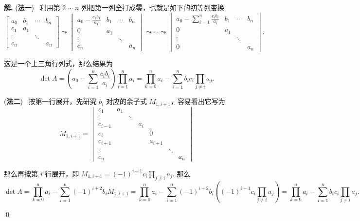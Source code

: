 \documentclass[10pt,openany]{article}
\theoremstyle{thmstyle} %
\theoremstyle{defstyle} %
\theoremstyle{prostyle} %
\theoremstyle{exastyle}
\theoremstyle{remstyle}
\newenvironment{solution}{\par\underline{\textbf{解.}} \;\fangsong}{\qed\par}
\begin{document}
\begin{solution} 
	(\textbf{法一}) \ 利用第 \( 2 \sim n \) 列把第一列全打成零，也就是如下的初等列变换
	\[ \begin{bmatrix}
		a_0 & b_1 & \cdots & b_n \\
		c_1 & a_1 &  & \\
		\vdots &  & \ddots & \\
		c_n &       &        & a_n
	\end{bmatrix} \leadsto \begin{vmatrix}
	a_0-\frac{c_1b_1}{a_1} & b_1 & \cdots & b_n \\
	0 & a_1 &  & \\
	\vdots &  & \ddots & \\
	c_n &       &        & a_n
	\end{vmatrix} \leadsto \cdots \leadsto \begin{vmatrix}
	a_0- \sum_{i=1}^{n}\frac{c_ib_i}{a_i} & b_1 & \cdots & b_n \\
	0 & a_1 &  & \\
	\vdots &  & \ddots & \\
	0 &       &        & a_n
	\end{vmatrix}. \]
	
	这是一个上三角行列式，那么结果为 
	\[ \det A= \left( a_0- \sum_{i=1}^{n}\frac{c_ib_i}{a_i} \right) \prod_{i=1}^{n} a_i=\prod_{k=0}^{n} a_i-\sum_{i=1}^{n} b_ic_i \prod_{j \neq i}^{} a_j.\]
	
	(\textbf{法二}) \ 按第一行展开，先研究 \( b_i \) 对应的余子式 \( M_{1,i+1} \)，容易看出它写为
	\[ M_{1,i+1}= \begin{vmatrix}
		c_1 & a_1 & & & & & \\
		\vdots & & \ddots & & & & \\
		c_{i-1} & &  & a_i & & & \\
		c_{i} & & &  &0  & & \\
		c_{i+1} & & &  & a_{i+1}  & & \\
		\vdots & & & &  & \ddots  & \\
		c_n & & & &  &  & a_n
	\end{vmatrix}\]
	
	那么再按第 \( i \) 行展开，即 \( M_{1,i+1}=(-1)^{i+1} c_i \prod_{j \neq i}^{} a_j \). 那么
	\[ \det A= \prod_{k=0}^{n} a_i- \sum_{i=1}^{n} (-1)^{i+2} b_i M_{1,i+1}= \prod_{k=0}^{n} a_i- \sum_{i=1}^{n} (-1)^{i+2} b_i \left( (-1)^{i+1} c_i \prod_{j \neq i}^{} a_j \right)= \prod_{k=0}^{n} a_i-\sum_{i=1}^{n} b_ic_i \prod_{j \neq i}^{} a_j. \]
	
\end{solution}
\end{document}
